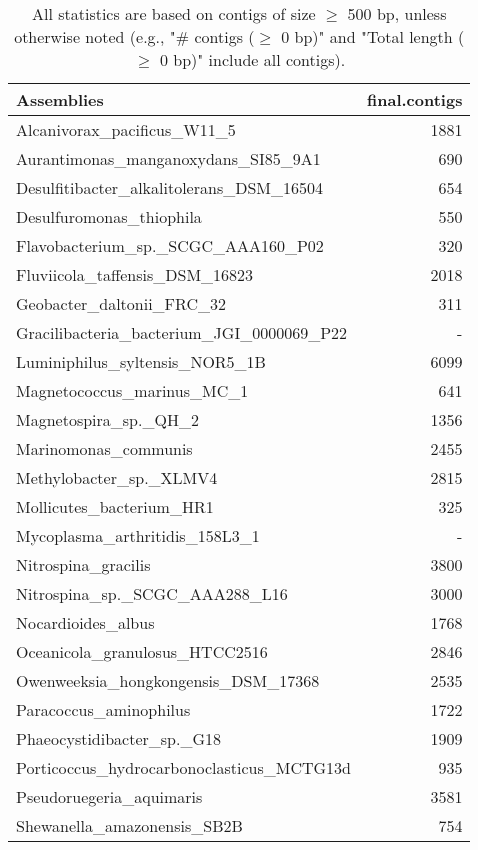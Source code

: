 \documentclass[12pt,a4paper]{article}
\begin{document}
\begin{table}[ht]
\begin{center}
\caption{All statistics are based on contigs of size $\geq$ 500 bp, unless otherwise noted (e.g., "\# contigs ($\geq$ 0 bp)" and "Total length ($\geq$ 0 bp)" include all contigs).}
\begin{tabular}{|l*{1}{|r}|}
\hline
Assemblies & final.contigs \\ \hline
Alcanivorax\_pacificus\_W11\_5 & 1881 \\ \hline
Aurantimonas\_manganoxydans\_SI85\_9A1 & 690 \\ \hline
Desulfitibacter\_alkalitolerans\_DSM\_16504 & 654 \\ \hline
Desulfuromonas\_thiophila & 550 \\ \hline
Flavobacterium\_sp.\_SCGC\_AAA160\_P02 & 320 \\ \hline
Fluviicola\_taffensis\_DSM\_16823 & 2018 \\ \hline
Geobacter\_daltonii\_FRC\_32 & 311 \\ \hline
Gracilibacteria\_bacterium\_JGI\_0000069\_P22 & - \\ \hline
Luminiphilus\_syltensis\_NOR5\_1B & 6099 \\ \hline
Magnetococcus\_marinus\_MC\_1 & 641 \\ \hline
Magnetospira\_sp.\_QH\_2 & 1356 \\ \hline
Marinomonas\_communis & 2455 \\ \hline
Methylobacter\_sp.\_XLMV4 & 2815 \\ \hline
Mollicutes\_bacterium\_HR1 & 325 \\ \hline
Mycoplasma\_arthritidis\_158L3\_1 & - \\ \hline
Nitrospina\_gracilis & 3800 \\ \hline
Nitrospina\_sp.\_SCGC\_AAA288\_L16 & 3000 \\ \hline
Nocardioides\_albus & 1768 \\ \hline
Oceanicola\_granulosus\_HTCC2516 & 2846 \\ \hline
Owenweeksia\_hongkongensis\_DSM\_17368 & 2535 \\ \hline
Paracoccus\_aminophilus & 1722 \\ \hline
Phaeocystidibacter\_sp.\_G18 & 1909 \\ \hline
Porticoccus\_hydrocarbonoclasticus\_MCTG13d & 935 \\ \hline
Pseudoruegeria\_aquimaris & 3581 \\ \hline
Shewanella\_amazonensis\_SB2B & 754 \\ \hline

\end{tabular}
\end{center}
\end{table}
\end{document}

